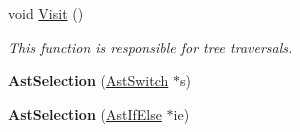 \begin{DoxyCompactItemize}
\item 
void \hyperlink{classAstSelection_a811114a424918b2141b5eb0e341c3a22}{Visit} ()
\begin{DoxyCompactList}\small\item\em This function is responsible for tree traversals. \end{DoxyCompactList}\item 
\hypertarget{classAstSelection_afac2e382bc352b49ca61e6017eb58130}{{\bfseries Ast\-Selection} (\hyperlink{classAstSwitch}{Ast\-Switch} $\ast$s)}\label{classAstSelection_afac2e382bc352b49ca61e6017eb58130}

\item 
\hypertarget{classAstSelection_aaed7d12c4b620b13f70e2d19e15eff0c}{{\bfseries Ast\-Selection} (\hyperlink{classAstIfElse}{Ast\-If\-Else} $\ast$ie)}\label{classAstSelection_aaed7d12c4b620b13f70e2d19e15eff0c}


\end{DoxyCompactItemize}
